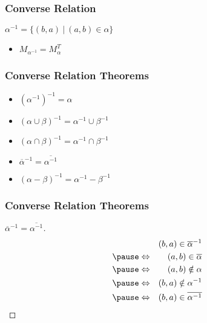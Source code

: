\documentclass[dvipsnames]{beamer}
\begin{document}
\begin{frame}
  \frametitle{Converse Relation}

  \begin{definition}
    $\alpha^{-1} = \{(b,a)~|~(a,b) \in \alpha \}$
  \end{definition}

  \begin{itemize}
    \item $M_{\alpha^{-1}} = M_{\alpha}^T$
  \end{itemize}
\end{frame}

\begin{frame}
  \frametitle{Converse Relation Theorems}

  \begin{itemize}
    \item $(\alpha^{-1})^{-1} = \alpha$
    \item $(\alpha \cup \beta)^{-1} = \alpha^{-1} \cup \beta^{-1}$
    \item $(\alpha \cap \beta)^{-1} = \alpha^{-1} \cap \beta^{-1}$
    \item $\overline{\alpha}^{-1} = \overline{\alpha^{-1}}$
    \item $(\alpha - \beta)^{-1} = \alpha^{-1} - \beta^{-1}$
  \end{itemize}
\end{frame}

\begin{frame}
  \frametitle{Converse Relation Theorems}

  \begin{proof}[$\overline{\alpha}^{-1} = \overline{\alpha^{-1}}$]
    \pause
    \begin{eqnarray*}
      &                 & (b,a) \in \overline{\alpha}^{-1}\\\pause
      & \Leftrightarrow & (a,b) \in \overline{\alpha}\\\pause
      & \Leftrightarrow & (a,b) \notin \alpha\\\pause
      & \Leftrightarrow & (b,a) \notin \alpha^{-1}\\\pause
      & \Leftrightarrow & (b,a) \in \overline{\alpha^{-1}}
    \end{eqnarray*}
  \end{proof}
\end{frame}
\end{document}
